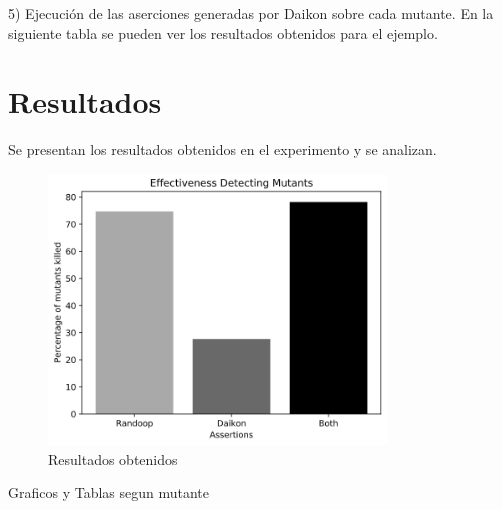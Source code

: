
\vspace{10pt}

5) Ejecución de las aserciones generadas por Daikon sobre cada mutante. En la siguiente tabla se pueden ver los resultados obtenidos para el ejemplo.

\vspace{10pt}


\vspace{10pt}


\section{Resultados}

Se presentan los resultados obtenidos en el experimento y se analizan.

\begin{figure}[ht]
\centering
\includegraphics[width=0.8\textwidth]{tools-effectiveness.png}
\caption{Resultados obtenidos}
\label{fig:nombre_etiqueta}
\end{figure}

\vspace{10pt}


\vspace{10pt}



Graficos y Tablas segun mutante

\vspace{10pt}


